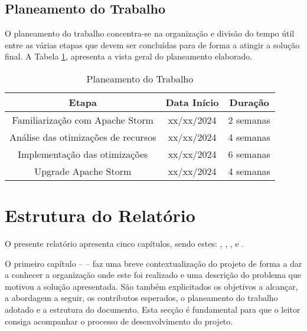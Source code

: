 \subsection{Planeamento do Trabalho}

O planeamento do trabalho concentra-se na organização e divisão do tempo útil entre as várias etapas
que devem ser concluídas para de forma a atingir a solução final. A Tabela \ref{tab:plan}, apresenta 
a vista geral do planeamento elaborado.

\begin{table}[H]
  \begin{center}
    \caption{Planeamento do Trabalho}
    \vspace{5mm}
    \label{tab:plan}
    \begin{tabular}{|c|c|c|}
      \hline
      \textbf{Etapa} & \textbf{Data Início} & \textbf{Duração} \\ \hline
      Familiarização com Apache Storm  & xx/xx/2024 & 2 semanas \\ \hline
      Análise das otimizações de recursos & xx/xx/2024 & 4 semanas \\ \hline
      Implementação das otimizações & xx/xx/2024 & 6 semanas \\ \hline
      Upgrade Apache Storm & xx/xx/2024 & 4 semanas \\ \hline
    \end{tabular}
  \end{center}
\end{table}

\section{Estrutura do Relatório}

O presente relatório apresenta cinco capítulos, sendo estes: ,
, ,  e
.

O primeiro capítulo –  – faz uma breve contextualização do projeto de
forma a dar a conhecer a organização onde este foi realizado e uma descrição do problema que motivou
a solução apresentada. São também explicitados os objetivos a alcançar, a abordagem a seguir, os
contributos esperados, o planeamento do trabalho adotado e a estrutura do documento. Esta secção é 
fundamental para que o leitor consiga acompanhar o processo de desenvolvimento do projeto.

